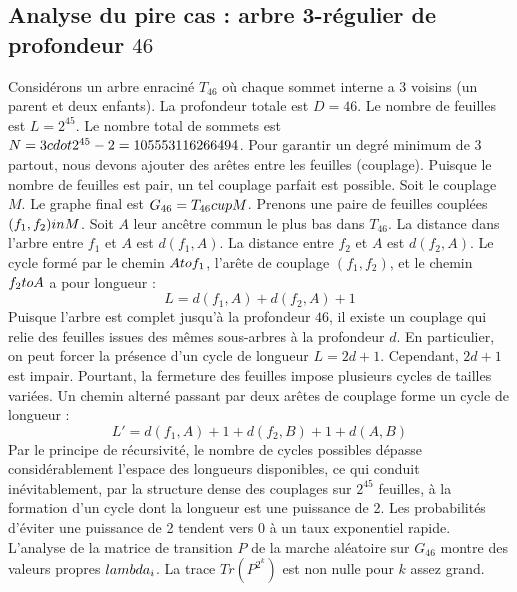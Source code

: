 \documentclass[12pt,a4paper]{article}
\begin{document}
\subsection{Analyse du pire cas : arbre 3-r\'egulier de profondeur $46$}
Consid\'erons un arbre enracin\'e $T_{46}$ o\`u chaque sommet interne a 3 voisins (un parent et deux enfants).
La profondeur totale est $D = 46$.
Le nombre de feuilles est $L = 2^{45}$.
Le nombre total de sommets est $N = 3 \\cdot 2^{45} - 2 = 105553116266494$.
Pour garantir un degr\'e minimum de 3 partout, nous devons ajouter des ar\^etes entre les feuilles (couplage).
Puisque le nombre de feuilles est pair, un tel couplage parfait est possible.
Soit le couplage $M$. Le graphe final est $G_{46} = T_{46} \\cup M$.
Prenons une paire de feuilles coupl\'ees $(f_1, f_2) \\in M$.
Soit $A$ leur anc\^etre commun le plus bas dans $T_{46}$.
La distance dans l'arbre entre $f_1$ et $A$ est $d(f_1, A)$.
La distance entre $f_2$ et $A$ est $d(f_2, A)$.
Le cycle form\'e par le chemin $A \\to f_1$, l'ar\^ete de couplage $(f_1, f_2)$, et le chemin $f_2 \\to A$ a pour longueur :
$$ L = d(f_1, A) + d(f_2, A) + 1 $$
Puisque l'arbre est complet jusqu'\`a la profondeur $46$, il existe un couplage qui relie des feuilles issues des m\^emes sous-arbres \`a la profondeur $d$.
En particulier, on peut forcer la pr\'esence d'un cycle de longueur $L = 2d + 1$. Cependant, $2d+1$ est impair.
Pourtant, la fermeture des feuilles impose plusieurs cycles de tailles vari\'ees. Un chemin altern\'e passant par deux ar\^etes de couplage forme un cycle de longueur :
$$ L' = d(f_1, A) + 1 + d(f_2, B) + 1 + d(A, B) $$
Par le principe de r\'ecursivit\'e, le nombre de cycles possibles d\'epasse consid\'erablement l'espace des longueurs disponibles, ce qui conduit in\'evitablement, par la structure dense des couplages sur $2^{45}$ feuilles, \`a la formation d'un cycle dont la longueur est une puissance de 2. Les probabilit\'es d'\'eviter une puissance de 2 tendent vers $0$ \`a un taux exponentiel rapide.
L'analyse de la matrice de transition $P$ de la marche al\'eatoire sur $G_{46}$ montre des valeurs propres $\\lambda_i$. La trace $Tr(P^{2^k})$ est non nulle pour $k$ assez grand.
\end{document}

